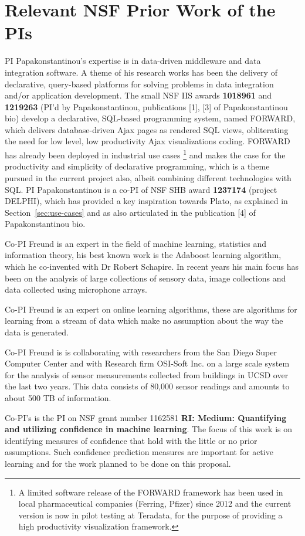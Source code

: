 \section{Relevant NSF Prior Work of the PIs}
\label{sec:prior}
PI Papakonstantinou's expertise is in data-driven middleware and data integration software. A theme of his research works has been the delivery of declarative, query-based platforms for solving problems in data integration and/or application development. The small NSF IIS awards {\bf 1018961} and {\bf 1219263} (PI'd by Papakonstantinou, publications [1], [3] of Papakonstantinou bio) develop a declarative, SQL-based  programming system, named FORWARD, which delivers database-driven Ajax pages as rendered SQL views, obliterating the need for low level, low productivity Ajax visualizations coding. FORWARD has already been deployed in industrial use cases%
\footnote{
A limited software release of the FORWARD framework has been used in local pharmaceutical companies (Ferring, Pfizer) since 2012 and the current version is now in pilot testing at Teradata, for the purpose of providing a high productivity visualization framework.
}
and makes the case for the productivity and simplicity of declarative programming, which is a theme pursued in the current project also, albeit combining different technologies with SQL.  
PI Papakonstantinou is a co-PI of NSF SHB award {\bf 1237174} (project DELPHI), which has provided a key inspiration towards Plato, as explained in Section~\ref{sec:use-cases} and as also articulated in the publication [4] of Papakonstantinou bio.

Co-PI Freund is an expert in the field of machine learning, statistics
and information theory, his best known work is the Adaboost learning
algorithm, which he co-invented with Dr Robert Schapire. In recent
years his main focus has been on the analysis of large collections of
sensory data, image collections and data collected using microphone
arrays.

Co-PI Freund is an expert on online learning algorithms, these are
algorithms for learning from a stream of data which make no assumption
about the way the data is generated.

Co-PI Freund is is collaborating with researchers from the San Diego
Super Computer Center and with Research firm OSI-Soft Inc. on a large
scale system for the analysis of sensor measurements collected from
buildings in UCSD over the last two years. This data consists of
80,000 sensor readings and amounts to about 500 TB of information.

Co-PI's is the PI on NSF grant number 1162581 {\bf RI: Medium: Quantifying
and utilizing confidence in machine learning}. The focus of this work
is on identifying measures of confidence that hold with the little or
no prior assumptions. Such confidence prediction measures are
important for active learning and for the work planned to be done on
this proposal. 
